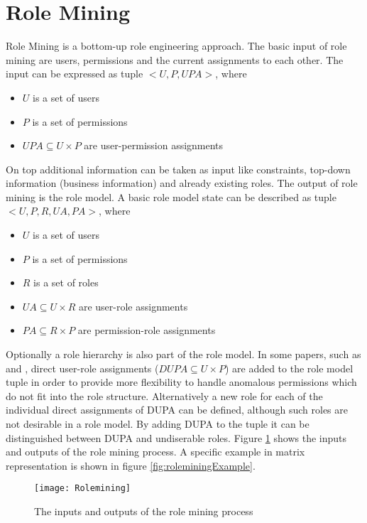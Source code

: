     \section{Role Mining}
    Role Mining is a bottom-up role engineering approach. The basic input of role mining are users, permissions and the current assignments to each other. The input can be expressed as tuple $<U,P,UPA>$, where
    \begin{itemize}[noitemsep,topsep=0pt,parsep=0pt,partopsep=0pt]
        \item \textbf{$U$} is a set of users
        \item \textbf{$P$} is a set of permissions
        \item \textbf{$UPA \subseteq U \times P$} are user-permission assignments
    \end{itemize}
    On top additional information can be taken as input like constraints, top-down information (business information) and already existing roles. The output of role mining is the role model. A basic role model state can be described as tuple $<U,P,R,UA,PA>$, where
    \begin{itemize}[noitemsep,topsep=0pt,parsep=0pt,partopsep=0pt]
        \item \textbf{$U$} is a set of users
        \item \textbf{$P$} is a set of permissions
        \item \textbf{$R$} is a set of roles
        \item \textbf{$UA \subseteq U \times R$} are user-role assignments
        \item \textbf{$PA \subseteq R \times P$} are permission-role assignments
    \end{itemize}
    Optionally a role hierarchy is also part of the role model. In some papers, such as \cite{Molloy} and \cite{DuChang}, direct user-role assignments ($DUPA \subseteq U \times P$) are added to the role model tuple in order to provide more flexibility to handle anomalous permissions which do not fit into the role structure. Alternatively a new role for each of the individual direct assignments of DUPA can be defined, although such roles are not desirable in a role model. By adding DUPA to the tuple it can be distinguished between DUPA and undiserable roles. Figure \ref{fig:rolemining} shows the inputs and outputs of the role mining process.  A specific example in matrix representation is shown in figure \ref{fig:roleminingExample}.
    \begin{figure}[H]
        \centering
        \texttt{[image: Rolemining]}
        \caption{The inputs and outputs of the role mining process}
        \label{fig:rolemining}
    \end{figure}
    
